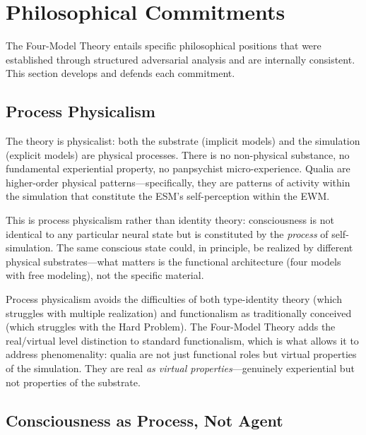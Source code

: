 \documentclass[12pt]{article}
\begin{document}
\section{Philosophical Commitments}

The Four-Model Theory entails specific philosophical positions that were established through structured adversarial analysis and are internally consistent. This section develops and defends each commitment.


\subsection{Process Physicalism}

The theory is physicalist: both the substrate (implicit models) and the simulation (explicit models) are physical processes. There is no non-physical substance, no fundamental experiential property, no panpsychist micro-experience. Qualia are higher-order physical patterns---\hspace{0pt}specifically, they are patterns of activity within the simulation that constitute the ESM's self-perception within the EWM.

This is process physicalism rather than identity theory: consciousness is not identical to any particular neural state but is constituted by the \emph{process} of self-simulation. The same conscious state could, in principle, be realized by different physical substrates---\hspace{0pt}what matters is the functional architecture (four models with free modeling), not the specific material.

Process physicalism avoids the difficulties of both type-identity theory (which struggles with multiple realization) and functionalism as traditionally conceived (which struggles with the Hard Problem). The Four-Model Theory adds the real/virtual level distinction to standard functionalism, which is what allows it to address phenomenality: qualia are not just functional roles but virtual properties of the simulation. They are real \emph{as virtual properties}---\hspace{0pt}genuinely experiential but not properties of the substrate.


\subsection{Consciousness as Process, Not Agent}
\end{document}
